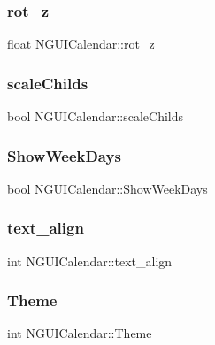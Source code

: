 \subsubsection{\texorpdfstring{rot\+\_\+z}{rot\_z}}
{\footnotesize\ttfamily float N\+G\+U\+I\+Calendar\+::rot\+\_\+z}

\hypertarget{class_n_g_u_i_calendar_a0f985eb7b433068b3aa6d72fcd22aa63}{}\label{class_n_g_u_i_calendar_a0f985eb7b433068b3aa6d72fcd22aa63} 
\subsubsection{\texorpdfstring{scale\+Childs}{scaleChilds}}
{\footnotesize\ttfamily bool N\+G\+U\+I\+Calendar\+::scale\+Childs}

\hypertarget{class_n_g_u_i_calendar_ab4f8e7b2ff0426273cbaec1134d895ba}{}\label{class_n_g_u_i_calendar_ab4f8e7b2ff0426273cbaec1134d895ba} 
\subsubsection{\texorpdfstring{Show\+Week\+Days}{ShowWeekDays}}
{\footnotesize\ttfamily bool N\+G\+U\+I\+Calendar\+::\+Show\+Week\+Days}

\hypertarget{class_n_g_u_i_calendar_a91282342a291cc6b094e95062437b495}{}\label{class_n_g_u_i_calendar_a91282342a291cc6b094e95062437b495} 
\subsubsection{\texorpdfstring{text\+\_\+align}{text\_align}}
{\footnotesize\ttfamily int N\+G\+U\+I\+Calendar\+::text\+\_\+align}

\hypertarget{class_n_g_u_i_calendar_a3e38bf8420871db2bea3329d3e949a32}{}\label{class_n_g_u_i_calendar_a3e38bf8420871db2bea3329d3e949a32} 
\subsubsection{\texorpdfstring{Theme}{Theme}}
{\footnotesize\ttfamily int N\+G\+U\+I\+Calendar\+::\+Theme}

